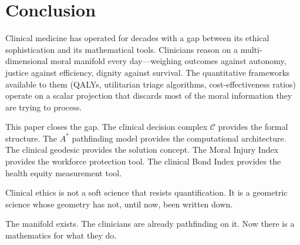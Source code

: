\documentclass[12pt]{article}
\theoremstyle{definition}
\theoremstyle{remark}
\newcommand{\C}{\mathcal{C}}               %
\begin{document}
\section{Conclusion}
\label{sec:conclusion}

Clinical medicine has operated for decades with a gap between its ethical sophistication and its mathematical tools.  Clinicians reason on a multi-dimensional moral manifold every day---weighing outcomes against autonomy, justice against efficiency, dignity against survival.  The quantitative frameworks available to them (QALYs, utilitarian triage algorithms, cost-effectiveness ratios) operate on a scalar projection that discards most of the moral information they are trying to process.

This paper closes the gap.  The clinical decision complex $\C$ provides the formal structure.  The $A^*$ pathfinding model provides the computational architecture.  The clinical geodesic provides the solution concept.  The Moral Injury Index provides the workforce protection tool.  The clinical Bond Index provides the health equity measurement tool.

Clinical ethics is not a soft science that resists quantification.  It is a geometric science whose geometry has not, until now, been written down.

The manifold exists.  The clinicians are already pathfinding on it.  Now there is a mathematics for what they do.
\end{document}
